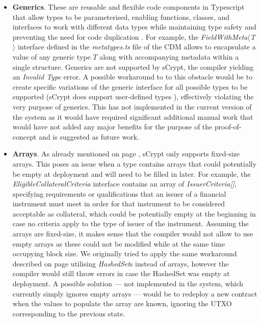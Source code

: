 \begin{itemize}
    \item \label{item:generics} \textbf{Generics}. These are reusable and flexible code components in Typescript that allow types to be parameterised, enabling functions, classes, and interfaces to work with different data types while maintaining type safety and preventing the need for code duplication \citep{generics}. For example, the \textit{FieldWithMeta$\langle $T $\rangle$} interface defined in the \textit{metatypes.ts} file of the CDM allows to encapsulate a value of any generic type $T$ along with accompanying metadata within a single structure. Generics are not supported by sCrypt, the compiler yielding an \textit{Invalid Type} error. A possible workaround to to this obstacle would be to create specific variations of the generic interface for all possible types to be supported (sCrypt does support user-defined types \citep{user-defined-types}), effectively violating the very purpose of generics. This has not implemented in the current version of the system as it would have required significant additional manual work that would have not added any major benefits for the purpose of the proof-of-concept and is suggested as future work.

    \item \textbf{Arrays}. As already mentioned on page \pageref{item:arrays}, sCrypt only supports fixed-size arrays. This poses an issue when a type contains arrays that could potentially be empty at deployment and will need to be filled in later. For example, the \textit{EligibleCollateralCriteria} interface contains an array of \textit{IssuerCriteria[]}, specifying requirements or qualifications that an issuer of a financial instrument must meet in order for that instrument to be considered acceptable as collateral, which could be potentially empty at the beginning in case no criteria apply to the type of issuer of the instrument. Assuming the arrays are fixed-size, it makes sense that the compiler would not allow to use empty arrays as these could not be modified while at the same time occupying block size. We originally tried to apply the same workaround described on page \pageref{item:arrays} utilising \textit{HashedSet}s instead of arrays, however the compiler would still throw errors in case the HashedSet was empty at deployment. A possible solution --- not implemented in the system, which currently simply ignores empty arrays --- would be to redeploy a new contract when the values to populate the array are known, ignoring the UTXO corresponding to the previous state.


\end{itemize}
